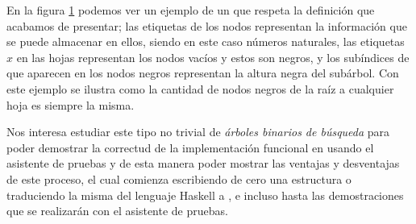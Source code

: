\begin{figure}[!ht]
\centering
\captionsetup{justification=centering}
\caption {\Arn}
\label{arbolRB_1}
\end{figure}

En la figura \ref{arbolRB_1} podemos ver un ejemplo de un {\arn} que respeta la definici\'on que
acabamos de presentar; las etiquetas de los nodos representan la informaci\'on que se puede almacenar en ellos, siendo en este caso n\'umeros naturales, las etiquetas $x$ en las hojas representan los nodos vacíos y estos
son negros, y los subíndices de que aparecen en los nodos negros representan la altura negra del sub\'arbol.
Con este ejemplo se ilustra como la cantidad de nodos negros de la ra\'iz a cualquier hoja es
siempre la misma.

Nos interesa estudiar este tipo no trivial de \textit{\'arboles binarios de búsqueda} para poder
demostrar la correctud de la implementaci\'on funcional en \cite{tesisG} 
usando el asistente de pruebas {\coq} y de esta
manera poder mostrar las ventajas y desventajas de este proceso, el cual comienza escribiendo de
cero una estructura o traduciendo la misma del lenguaje Haskell a {\coq}, e incluso hasta las
demostraciones que se realizar\'an con el asistente de pruebas.

